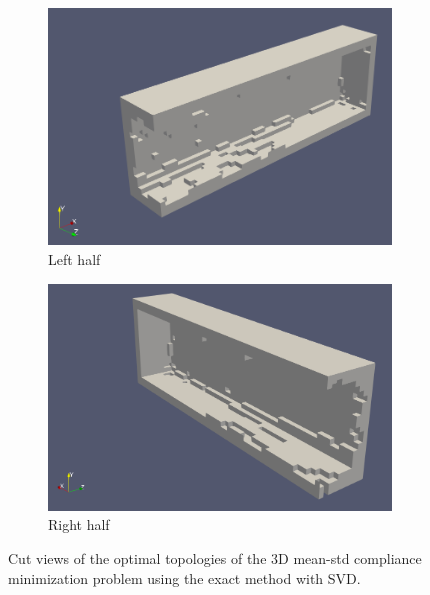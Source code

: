       \begin{figure}
        \begin{subfigure}[t]{0.45\textwidth}
          \centering
          \includegraphics[width=1\textwidth]{./images/robust_exact/exact_mean_std_1.png}
          \caption{Left half}
        \end{subfigure}
        \begin{subfigure}[t]{0.45\textwidth}
          \centering
          \includegraphics[width=1\textwidth]{./images/robust_exact/exact_mean_std_2.png}
          \caption{Right half}
        \end{subfigure}
        \caption{Cut views of the optimal topologies of the 3D mean-std compliance minimization problem using the exact method with SVD.}
        \label{fig:exact_mean_std_3d}
      \end{figure}

